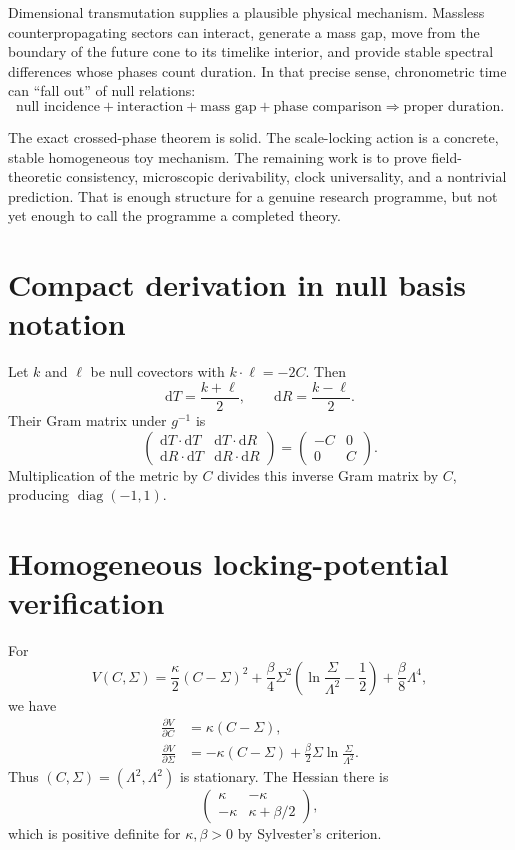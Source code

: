 \documentclass[11pt,a4paper]{article}
\newcommand{\dd}{\mathrm{d}}
\newcommand{\Ccross}{C}
\begin{document}
Dimensional transmutation supplies a plausible physical mechanism. Massless counterpropagating sectors can interact, generate a mass gap, move from the boundary of the future cone to its timelike interior, and provide stable spectral differences whose phases count duration. In that precise sense, chronometric time can ``fall out'' of null relations:
\[
\boxed{
\text{null incidence}
+\text{interaction}
+\text{mass gap}
+\text{phase comparison}
\Longrightarrow
\text{proper duration}.
}
\]

The exact crossed-phase theorem is solid. The scale-locking action is a concrete, stable homogeneous toy mechanism. The remaining work is to prove field-theoretic consistency, microscopic derivability, clock universality, and a nontrivial prediction. That is enough structure for a genuine research programme, but not yet enough to call the programme a completed theory.

\appendix

\section{Compact derivation in null basis notation}

Let $k$ and $\ell$ be null covectors with $k\cdot\ell=-2\Ccross$. Then
\[
\dd T=\frac{k+\ell}{2},
\qquad
\dd R=\frac{k-\ell}{2}.
\]
Their Gram matrix under $g^{-1}$ is
\[
\begin{pmatrix}
\dd T\cdot\dd T & \dd T\cdot\dd R\\
\dd R\cdot\dd T & \dd R\cdot\dd R
\end{pmatrix}
=
\begin{pmatrix}
-\Ccross & 0\\
0 & \Ccross
\end{pmatrix}.
\]
Multiplication of the metric by $\Ccross$ divides this inverse Gram matrix by $\Ccross$, producing $\operatorname{diag}(-1,1)$.

\section{Homogeneous locking-potential verification}

For
\[
V(C,\Sigma)=\frac\kappa2(C-\Sigma)^2+
\frac\beta4\Sigma^2\left(\ln\frac{\Sigma}{\Lambda^2}-\frac12\right)
+\frac\beta8\Lambda^4,
\]
we have
\begin{align}
\frac{\partial V}{\partial C}&=\kappa(C-\Sigma),\\
\frac{\partial V}{\partial\Sigma}&=-\kappa(C-\Sigma)+\frac\beta2\Sigma\ln\frac{\Sigma}{\Lambda^2}.
\end{align}
Thus $(C,\Sigma)=(\Lambda^2,\Lambda^2)$ is stationary. The Hessian there is
\[
\begin{pmatrix}
\kappa&-\kappa\\
-\kappa&\kappa+\beta/2
\end{pmatrix},
\]
which is positive definite for $\kappa,\beta>0$ by Sylvester's criterion.
\end{document}
